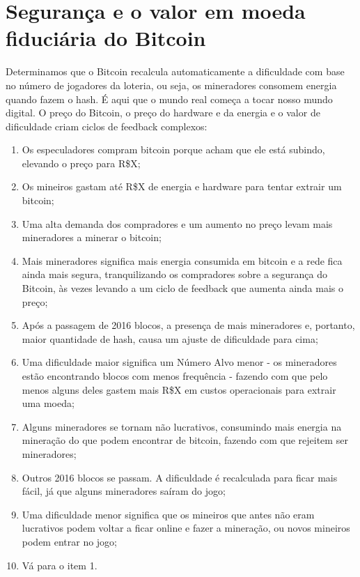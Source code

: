 \section*{Segurança e o valor em moeda fiduciária do Bitcoin}

Determinamos que o Bitcoin recalcula automaticamente a dificuldade com base no número de jogadores da loteria, ou seja, os mineradores consomem energia quando fazem o hash. É aqui que o mundo real começa a tocar nosso mundo digital. O preço do Bitcoin, o preço do hardware e da energia e o valor de dificuldade criam ciclos de feedback complexos:

\begin{enumerate}
\item Os especuladores compram bitcoin porque acham que ele está subindo, elevando o preço para R\$X;
\item Os mineiros gastam até R\$X de energia e hardware para tentar extrair um bitcoin;
\item Uma alta demanda dos compradores e um aumento no preço levam mais mineradores a minerar o bitcoin;
\item Mais mineradores significa mais energia consumida em bitcoin e a rede fica ainda mais segura, tranquilizando os compradores sobre a segurança do Bitcoin, às vezes levando a um ciclo de feedback que aumenta ainda mais o preço;
\item Após a passagem de 2016 blocos, a presença de mais mineradores e, portanto, maior quantidade de hash, causa um ajuste de dificuldade para cima;
\item Uma dificuldade maior significa um Número Alvo menor - os mineradores estão encontrando blocos com menos frequência - fazendo com que pelo menos alguns deles gastem mais R\$X em custos operacionais para extrair uma moeda;
\item Alguns mineradores se tornam não lucrativos, consumindo mais energia na mineração do que podem encontrar de bitcoin, fazendo com que rejeitem ser mineradores;
\item Outros 2016 blocos se passam. A dificuldade é recalculada para ficar mais fácil, já que alguns mineradores saíram do jogo;
\item Uma dificuldade menor significa que os mineiros que antes não eram lucrativos podem voltar a ficar online e fazer a mineração, ou novos mineiros podem entrar no jogo;
\item Vá para o item 1.
\end{enumerate}

